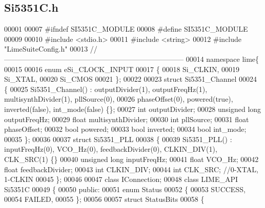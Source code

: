 \subsection{Si5351\+C.\+h}
\label{Si5351C_8h_source}

\begin{DoxyCode}
00001 
00007 \textcolor{preprocessor}{#ifndef SI5351C\_MODULE}
00008 \textcolor{preprocessor}{#define SI5351C\_MODULE}
00009 
00010 \textcolor{preprocessor}{#include <stdio.h>}
00011 \textcolor{preprocessor}{#include <string>}
00012 \textcolor{preprocessor}{#include "LimeSuiteConfig.h"}
00013 \textcolor{comment}{//---------------------------------------------------------------------------}
00014 \textcolor{keyword}{namespace }lime\{
00015 
00016 \textcolor{keyword}{enum} eSi_CLOCK_INPUT
00017 \{
00018     Si_CLKIN,
00019     Si_XTAL,
00020     Si_CMOS
00021 \};
00022 
00023 \textcolor{keyword}{struct }Si5351_Channel
00024 \{
00025     Si5351_Channel() : outputDivider(1), outputFreqHz(1), multisynthDivider(1), 
      pllSource(0),
00026         phaseOffset(0), powered(true), inverted(false), int_mode(false) \{\};
00027     \textcolor{keywordtype}{int} outputDivider;
00028     \textcolor{keywordtype}{unsigned} \textcolor{keywordtype}{long} outputFreqHz;
00029     \textcolor{keywordtype}{float} multisynthDivider;
00030     \textcolor{keywordtype}{int} pllSource;
00031     \textcolor{keywordtype}{float} phaseOffset;
00032     \textcolor{keywordtype}{bool} powered;
00033     \textcolor{keywordtype}{bool} inverted;
00034     \textcolor{keywordtype}{bool} int_mode;
00035 \};
00036 
00037 \textcolor{keyword}{struct }Si5351_PLL
00038 \{
00039     Si5351_PLL() : inputFreqHz(0), VCO\_Hz(0), feedbackDivider(0), CLKIN\_DIV(1), CLK\_SRC(1) \{\}
00040     \textcolor{keywordtype}{unsigned} \textcolor{keywordtype}{long} inputFreqHz;
00041     \textcolor{keywordtype}{float} VCO_Hz;
00042     \textcolor{keywordtype}{float} feedbackDivider;
00043     \textcolor{keywordtype}{int} CLKIN_DIV;
00044     \textcolor{keywordtype}{int} CLK_SRC; \textcolor{comment}{//0-XTAL, 1-CLKIN}
00045 \};
00046 
00047 \textcolor{keyword}{class }IConnection;
00048 \textcolor{keyword}{class }LIME_API Si5351C
00049 \{
00050 \textcolor{keyword}{public}:
00051     \textcolor{keyword}{enum} Status
00052     \{
00053         SUCCESS,
00054         FAILED,
00055     \};
00056 
00057     \textcolor{keyword}{struct }StatusBits
00058     \{

\end{DoxyCode}
